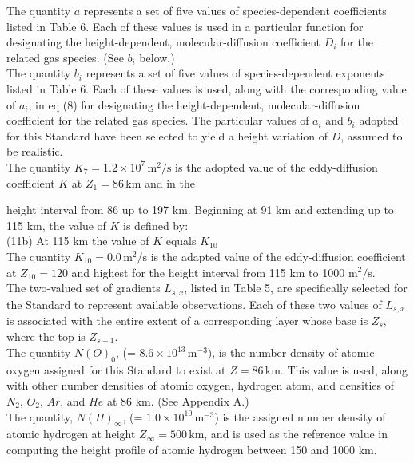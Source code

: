 \documentclass{article}
\begin{document}
\noindent The quantity \(a\) represents a set of five values of species-dependent coefficients listed in Table 6. Each of these values is used in a particular function for designating the height-dependent, molecular-diffusion coefficient \(D_i\) for the related gas species. (See \(b_i\) below.)\\
\noindent The quantity \(b_i\) represents a set of five values of species-dependent exponents listed in Table 6. Each of these values is used, along with the corresponding value of \(a_i\), in eq (8) for designating the height-dependent, molecular-diffusion coefficient for the related gas species. The particular values of \(a_i\) and \(b_i\) adopted for this Standard have been selected to yield a height variation of \(D\), assumed to be realistic.\\
The quantity \(K_7 = 1.2 \times 10^7 \, \mathrm{m^2/s}\) is the adopted value of the eddy-diffusion coefficient \(K\) at \(Z_1 = 86 \, \mathrm{km}\) and in the

height interval from 86 up to 197 km. Beginning at 91 km and extending up to 115 km, the value of \(K\) is defined by:\\
(11b) At 115 km the value of \(K\) equals \(K_{10}\)\\
The quantity \(K_{10} = 0.0 \, \text{m}^2/\text{s}\) is the adapted value of the eddy-diffusion coefficient at \(Z_{10} = 120\) and highest for the height interval from 115 km to 1000 \( \text{m}^2/\text{s}\).\\
The two-valued set of gradients \(L_{s,x}\), listed in Table 5, are specifically selected for the Standard to represent available observations. Each of these two values of \(L_{s,x}\) is associated with the entire extent of a corresponding layer whose base is \(Z_s\), where the top is \(Z_{s+1}\).\\
The quantity \(N(O)_0\), (= \(8.6 \times 10^{13} \, \text{m}^{-3}\)), is the number density of atomic oxygen assigned for this Standard to exist at \(Z = 86 \, \text{km}\). This value is used, along with other number densities of atomic oxygen, hydrogen atom, and densities of \(N_2\), \(O_2\), \(Ar\), and \(He\) at 86 km. (See Appendix A.)\\
The quantity, \(N(H)_\infty\), (= \(1.0 \times 10^{10} \, \text{m}^{-3}\)) is the assigned number density of atomic hydrogen at height \(Z_\infty = 500 \, \text{km}\), and is used as the reference value in computing the height profile of atomic hydrogen between 150 and 1000 km.\\
\end{document}
